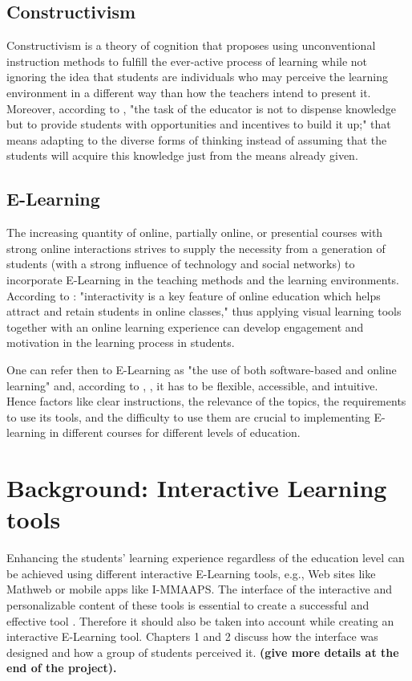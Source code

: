 \subsection{Constructivism}
Constructivism is a theory of cognition that proposes using unconventional instruction methods to fulfill the ever-active process of learning while not ignoring the idea that students are individuals who may perceive the learning environment in a different way than how the teachers intend to present it. Moreover, according to \cite{fosnot2013constructivism}, "the task of the educator is not to dispense knowledge but to provide students with opportunities and incentives to build it up;" that means adapting to the diverse forms of thinking instead of assuming that the students will acquire this knowledge just from the means already given.


\subsection{E-Learning}
The increasing quantity of online, partially online, or presential courses with strong online interactions strives to supply the necessity from a generation of students (with a strong influence of technology and social networks) to incorporate E-Learning in the teaching methods and the learning environments.  According to \cite{vltool}: "interactivity is a key feature of online education which helps attract and retain students in online classes," thus applying visual learning tools together with an online learning experience can develop engagement and motivation in the learning process in students. 

One can refer then to E-Learning as "the use of both software-based and online learning"  \cite{tabak} and, according to \cite{tabak}, \cite{munoz}, it has to be flexible, accessible, and intuitive. Hence factors like clear instructions, the relevance of the topics, the requirements to use its tools, and the difficulty to use them are crucial to implementing E-learning in different courses for different levels of education.

\section{Background: Interactive Learning tools}

Enhancing the students' learning experience regardless of the education level can be achieved using different interactive E-Learning tools, e.g., Web sites like Mathweb or mobile apps like I-MMAAPS. The interface of the interactive and personalizable content of these tools is essential to create a successful and effective tool \cite{vltool}. Therefore it should also be taken into account while creating an interactive E-Learning tool. Chapters 1 and 2 discuss how the interface was designed  and how a group of students perceived it.\textbf{ (give more details at the end of the project). }



